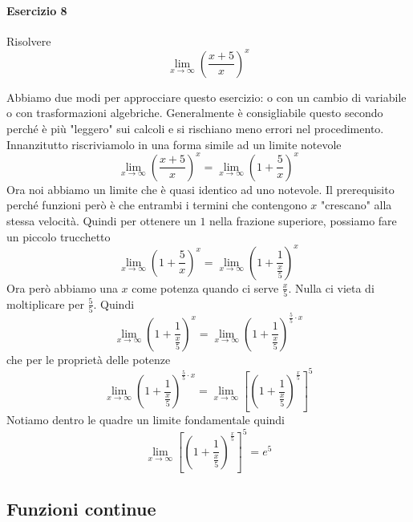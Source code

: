 \paragraph{Esercizio 8}
Risolvere
\begin{equation*}
\lim\limits_{x\to\infty}\left(\frac{x+5}{x}\right)^x
\end{equation*}
\divisor

Abbiamo due modi per approcciare questo esercizio: o con un cambio di variabile o con trasformazioni
algebriche. Generalmente è consigliabile questo secondo perché è più "leggero" sui calcoli e si 
rischiano meno errori nel procedimento.\\
Innanzitutto riscriviamolo in una forma simile ad un limite notevole
\begin{equation*}
\lim\limits_{x\to\infty}\left(\frac{x+5}{x}\right)^x = 
\lim\limits_{x\to\infty}\left(1+\frac{5}{x}\right)^x
\end{equation*}
Ora noi abbiamo un limite che è quasi identico ad uno notevole. Il prerequisito perché funzioni però
è che entrambi i termini che contengono $x$ "crescano" alla stessa velocità. Quindi per ottenere
un $1$ nella frazione superiore, possiamo fare un piccolo trucchetto
\begin{equation*}
\lim\limits_{x\to\infty}\left(1+\frac{5}{x}\right)^x=
\lim\limits_{x\to\infty}\left(1+\frac{1}{\frac{x}{5}}\right)^x
\end{equation*}
Ora però abbiamo una $x$ come potenza quando ci serve $\frac{x}{5}$. Nulla ci vieta di moltiplicare
per $\frac{5}{5}$. Quindi
\begin{equation*}
\lim\limits_{x\to\infty}\left(1+\frac{1}{\frac{x}{5}}\right)^x=
\lim\limits_{x\to\infty}\left(1+\frac{1}{\frac{x}{5}}\right)^{\frac{5}{5}\cdot x}
\end{equation*}
che per le proprietà delle potenze
\begin{equation*}
\lim\limits_{x\to\infty}\left(1+\frac{1}{\frac{x}{5}}\right)^{\frac{5}{5}\cdot x}=
\lim\limits_{x\to\infty}\left[\left(1+\frac{1}{\frac{x}{5}}\right)^\frac{x}{5}\right]^5
\end{equation*}
Notiamo dentro le quadre un limite fondamentale quindi
\begin{equation*}
\lim\limits_{x\to\infty}\left[\left(1+\frac{1}{\frac{x}{5}}\right)^\frac{x}{5}\right]^5=\boxed{e^5}
\end{equation*}

\subsection*{Funzioni continue}
\label{ex:funzCont}

